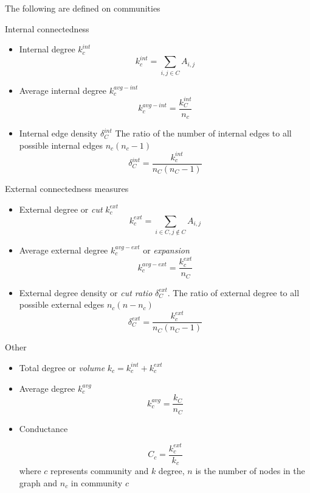 The following are defined on communities

Internal connectedness
\begin{itemize}
    \item Internal degree $k_c^{int}$
    \begin{equation}
        k_c^{int}=\sum_{i,j\in C}A_{i,j}
    \end{equation}
    \item Average internal degree $k_c^{avg-int}$
    \begin{equation}
        k_c^{avg-int}=\frac{k_C^{int}}{n_c}
    \end{equation}
    \item Internal edge density $\delta_C^{int}$ The ratio of the number of internal edges to all possible internal edges $n_c(n_c-1)$
    \begin{equation}
        \delta_C^{int} = \frac{k_c^{int}}{n_C(n_C-1)}
    \end{equation}
    \end{itemize}
    External connectedness measures 
    \begin{itemize}
    \item External degree or \textit{cut} $k_c^{ext}$
    \begin{equation}
    k_c^{ext}=\sum_{i \in C, j \notin C}A_{i,j}
    \end{equation}
    \item Average external degree $k_c^{avg-ext}$ or \textit{expansion}
    \begin{equation}
        k_c^{avg-ext}=\frac{ k_c^{ext}}{n_C}
    \end{equation}
    \item External degree density or \textit{cut ratio} $\delta_C^{ext}$. The ratio of external degree to all possible external edges $n_c(n-n_c)$
    \begin{equation}
        \delta_C^{ext}=\frac{ k_c^{ext}}{n_C(n_C-1)}
    \end{equation}
    \end{itemize}
 Other 
    \begin{itemize}

    \item Total degree or \textit{volume} $k_c= k_c^{int}+k_c^{ext}$
    \item Average degree $k_c^{avg}$
    \begin{equation}
        k_c^{avg}=\frac{k_C}{n_C}
    \end{equation}
    \item Conductance
    
    \begin{equation}
    C_c = \frac{k_c^{ext}}{k_c}
    \label{eq:conductance}
    \end{equation}
    where $c$ represents community and $k$ degree, $n$ is the number of nodes in the graph and $n_c$ in community $c$
\end{itemize}




